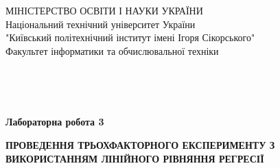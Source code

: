 \begin{titlepage}
     \begin{center}
      {\selectfont МІНІСТЕРСТВО ОСВІТИ І НАУКИ УКРАЇНИ} \\
      Національний технічний університет України
      \\ "Київський політехнічний інститут імені Ігоря Сікорського"
      \\ Факультет інформатики та обчислювальної техніки
     \end{center}  

    $\;$
    
    $\;$
    
    $\;$
    
    $\;$
    
    $\;$
    
    \vspace{0.5cm}
    \begin{center}
     {\large\textbf{Лабораторна робота 3}\par}
     \vspace{0.5cm}
     \textbf{ПРОВЕДЕННЯ ТРЬОХФАКТОРНОГО ЕКСПЕРИМЕНТУ З ВИКОРИСТАННЯМ
     ЛІНІЙНОГО РІВНЯННЯ РЕГРЕСІЇ}
    \end{center}
    \vspace{2.5cm}


\end{titlepage}
